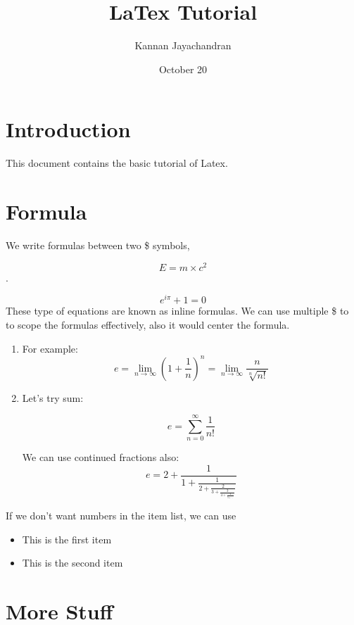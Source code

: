\documentclass{article}
\title{LaTex Tutorial}
\author{Kannan Jayachandran}
\date{October 20}
\begin{document}
\maketitle

\section{Introduction}
This document contains the basic tutorial of Latex.

\section*{Formula}
We write formulas between two \$ symbols,

$$E = m \times c^2$$.

$$e^{i\pi} + 1 = 0$$
These type of equations are known as inline formulas. We can use multiple \$ to to scope the formulas effectively, also it would center the formula.

\begin{enumerate}
\item For example:
$$e =  \lim_{n \to \infty} \left(1 + \frac{1}{n}\right) ^ n = \lim_{n \to \infty} \frac{n}{\sqrt[n]{n!}}$$

\item Let's try sum:

$$e = \sum_{n=0}^ {\infty} \frac{1}{n!} $$

We can use continued fractions also:
$$ e=2+\frac{1}{1+\frac{1}{2+\frac{2}{3+\frac{3}{4+\frac{4}{5+\ddots}}}}}$$
\end{enumerate}

If we don't want numbers in the item list, we can use 
\begin{itemize}
    \item This is the first item
    \item This is the second item
\end{itemize}
 
\section*{More Stuff}
\end{document}
